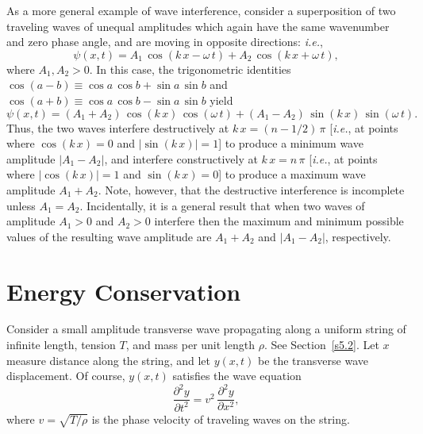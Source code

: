 As a more general example of wave interference,  consider a superposition
of two traveling waves of unequal amplitudes which again have the same wavenumber
and zero phase angle,
and are moving in opposite directions: {\em i.e.},
\begin{equation}
\psi(x,t) = A_1\,\cos(k\,x-\omega\,t) + A_2\,\cos(k\,x+\omega\,t),
\end{equation}
where $A_1, A_2>0$. 
In this case, the trigonometric identities $\cos(a-b)\equiv \cos a\,\cos b+\sin a\,\sin b$
and $\cos(a+b)\equiv \cos a\,\cos b-\sin a\,\sin b$ yield
\begin{equation}
\psi(x,t)= (A_1+A_2)\,\cos(k\,x)\,\cos(\omega\,t) + (A_1-A_2)\,\sin(k\,x)\,\sin(\omega\,t).
\end{equation}
Thus, the two waves interfere destructively at $k\,x=(n-1/2)\,\pi$ [{\em i.e.}, at points where $\cos(k\,x)=0$ and $|\sin(k\,x)|=1$]  to produce a minimum wave amplitude $|A_1-A_2|$, and interfere constructively
at $k\,x=n\,\pi$ [{\em i.e.}, at points where $|\cos(k\,x)|=1$ and $\sin(k\,x)=0$]  to produce a maximum wave amplitude $A_1+A_2$. Note, however,
that the destructive interference is incomplete unless $A_1=A_2$. Incidentally, it is a general
result that when two waves of amplitude $A_1>0$ and $A_2>0$ interfere then
the maximum and minimum possible values of the resulting wave amplitude are $A_1+A_2$ and 
$|A_1-A_2|$, respectively. 

\section{Energy Conservation}
Consider a small amplitude transverse wave propagating along a uniform string of infinite length, tension
$T$, and mass per unit length $\rho$. See Section~\ref{s5.2}. Let $x$ measure
distance along the string, and let $y(x,t)$ be the transverse wave displacement.
Of course, $y(x,t)$ satisfies the wave equation
\begin{equation}\label{e7.22}
\frac{\partial^2 y}{\partial t^2} = v^2\,\frac{\partial^2 y}{\partial x^2},
\end{equation}
where $v=\sqrt{T/\rho}$ is the phase velocity of traveling waves on the string.

